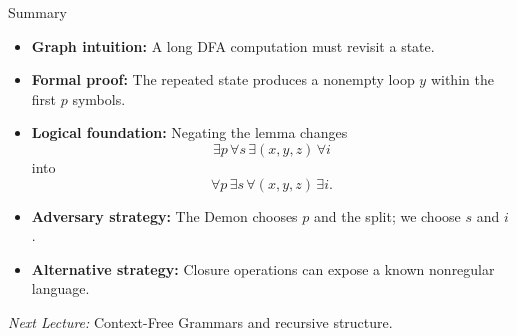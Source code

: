 \documentclass[10pt,aspectratio=169]{beamer}
\begin{document}
\begin{frame}{Summary}
\begin{itemize}
    \item \textbf{Graph intuition:} A long DFA computation must revisit a state.
    \item \textbf{Formal proof:} The repeated state produces a nonempty loop $y$ within the first $p$ symbols.
    \item \textbf{Logical foundation:} Negating the lemma changes
    \[
    \exists p\,\forall s\,\exists(x,y,z)\,\forall i
    \]
    into
    \[
    \forall p\,\exists s\,\forall(x,y,z)\,\exists i.
    \]
    \item \textbf{Adversary strategy:} The Demon chooses $p$ and the split; we choose $s$ and $i$.
    \item \textbf{Alternative strategy:} Closure operations can expose a known nonregular language.
\end{itemize}

\vspace{0.8em}
\textit{Next Lecture:} Context-Free Grammars and recursive structure.
\end{frame}
\end{document}
